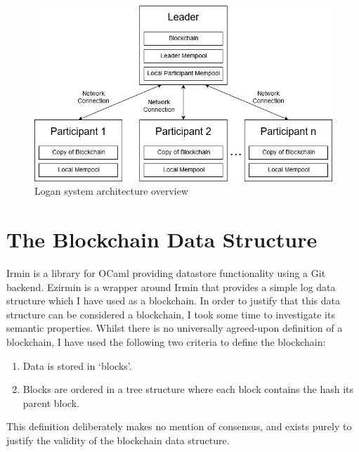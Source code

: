 \documentclass[12pt,a4paper,twoside,openright]{report}
\begin{document}
	\begin{figure}
		\centering
		\includegraphics[width=16cm]{figs/System_Architecture.png}
		\caption{Logan system architecture overview}
		\label{fig:sysarch}
	\end{figure}

	\section{The Blockchain Data Structure}\label{sec:datastructure}
	Irmin  \cite{Irmin} is a library for OCaml providing datastore functionality using a Git backend.
	Ezirmin is a wrapper around Irmin that provides a simple log data structure which I have used as a blockchain.
	In order to justify that this data structure can be considered a blockchain, I took some time to investigate its semantic properties. 
	Whilst there is no universally agreed-upon definition of a blockchain, I have used the following two criteria to define the blockchain:
	\begin{enumerate}
		\item Data is stored in `blocks'.
		\item Blocks are ordered in a tree structure where each block contains the hash its parent block.
	\end{enumerate}
	This definition deliberately makes no mention of consensus, and exists purely to justify the validity of the blockchain data structure.
\end{document}
